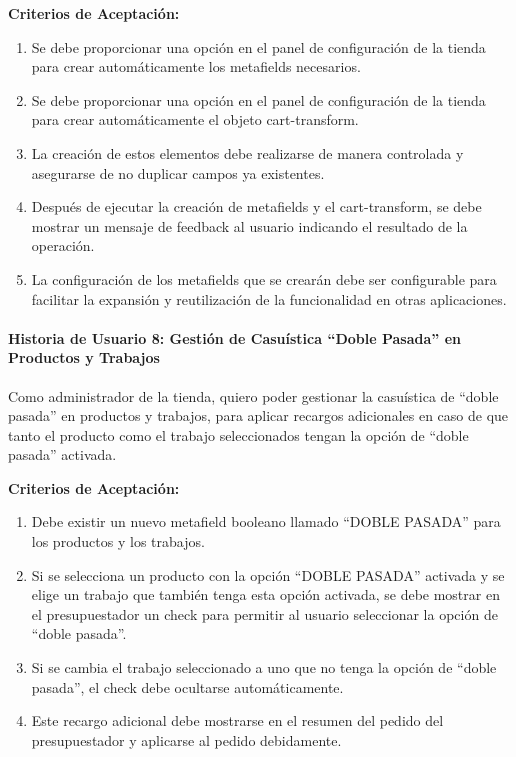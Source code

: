 \documentclass[12pt]{article}
\newcommand{\subsubsubsection}[1]{\paragraph{#1}}
\begin{document}
\vspace{0.5cm}
\textbf{Criterios de Aceptación:}
\begin{enumerate}[label=\arabic*.]
    \item Se debe proporcionar una opción en el panel de configuración de la tienda para crear automáticamente los metafields necesarios.
    \item Se debe proporcionar una opción en el panel de configuración de la tienda para crear automáticamente el objeto cart-transform.
    \item La creación de estos elementos debe realizarse de manera controlada y asegurarse de no duplicar campos ya existentes.
    \item Después de ejecutar la creación de metafields y el cart-transform, se debe mostrar un mensaje de feedback al usuario indicando el resultado de la operación.
    \item La configuración de los metafields que se crearán debe ser configurable para facilitar la expansión y reutilización de la funcionalidad en otras aplicaciones.
\end{enumerate}


\subsubsubsection{Historia de Usuario 8: Gestión de Casuística ``Doble Pasada'' en Productos y Trabajos}\label{sec:historia8}

Como administrador de la tienda,
quiero poder gestionar la casuística de ``doble pasada'' en productos y trabajos,
para aplicar recargos adicionales en caso de que tanto el producto como el trabajo seleccionados tengan la opción de ``doble pasada'' activada.

\vspace{0.5cm}
\textbf{Criterios de Aceptación:}
\begin{enumerate}[label=\arabic*.]
    \item Debe existir un nuevo metafield booleano llamado ``DOBLE PASADA'' para los productos y los trabajos.
    \item Si se selecciona un producto con la opción ``DOBLE PASADA'' activada y se elige un trabajo que también tenga esta opción activada, se debe mostrar en el presupuestador un check para permitir al usuario seleccionar la opción de ``doble pasada''.
    \item Si se cambia el trabajo seleccionado a uno que no tenga la opción de ``doble pasada'', el check debe ocultarse automáticamente.
    \item Este recargo adicional debe mostrarse en el resumen del pedido del presupuestador y aplicarse al pedido debidamente.
\end{enumerate}
\end{document}
